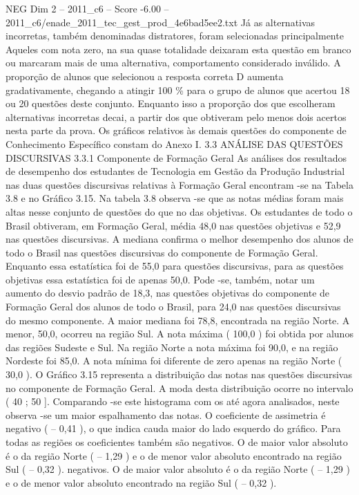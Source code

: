 \begin{textsample}{NEG Dim 2 – 2011\_c6 – Score -6.00 – 2011\_c6/enade\_2011\_tec\_gest\_prod\_4e6bad5ee2.txt}
Já as alternativas incorretas, também denominadas distratores, foram selecionadas principalmente Aqueles com nota zero, na sua quase totalidade deixaram esta questão em branco ou marcaram mais de uma alternativa, comportamento considerado inválido.
A proporção de alunos que selecionou a resposta correta D aumenta gradativamente, chegando a atingir 100 \% para o grupo de alunos que acertou 18 ou 20 questões deste conjunto.
Enquanto isso a proporção dos que escolheram alternativas incorretas decai, a partir dos que obtiveram pelo menos dois acertos nesta parte da prova.
Os gráficos relativos às demais questões do componente de Conhecimento Específico constam do Anexo I. 3.3 ANÁLISE DAS QUESTÕES DISCURSIVAS 3.3.1 Componente de Formação Geral As análises dos resultados de desempenho dos estudantes de Tecnologia em Gestão da Produção Industrial nas duas questões discursivas relativas à Formação Geral encontram -se na Tabela 3.8 e no Gráfico 3.15.
Na tabela 3.8 observa -se que as notas médias foram mais altas nesse conjunto de questões do que no das objetivas.
Os estudantes de todo o Brasil obtiveram, em Formação Geral, média 48,0 nas questões objetivas e 52,9 nas questões discursivas.
A mediana confirma o melhor desempenho dos alunos de todo o Brasil nas questões discursivas do componente de Formação Geral.
Enquanto essa estatística foi de 55,0 para questões discursivas, para as questões objetivas essa estatística foi de apenas 50,0.
Pode -se, também, notar um aumento do desvio padrão de 18,3, nas questões objetivas do componente de Formação Geral dos alunos de todo o Brasil, para 24,0 nas questões discursivas do mesmo componente.
A maior mediana foi 78,8, encontrada na região Norte.
A menor, 50,0, ocorreu na região Sul.
A nota máxima ( 100,0 ) foi obtida por alunos das regiões Sudeste e Sul.
Na região Norte a nota máxima foi 90,0, e na região Nordeste foi 85,0.
A nota mínima foi diferente de zero apenas na região Norte ( 30,0 ).
O Gráfico 3.15 representa a distribuição das notas nas questões discursivas no componente de Formação Geral.
A moda desta distribuição ocorre no intervalo ( 40 ; 50 ].
Comparando -se este histograma com os até agora analisados, neste observa -se um maior espalhamento das notas.
O coeficiente de assimetria é negativo ( – 0,41 ), o que indica cauda maior do lado esquerdo do gráfico.
Para todas as regiões os coeficientes também são negativos.
O de maior valor absoluto é o da região Norte ( – 1,29 ) e o de menor valor absoluto encontrado na região Sul ( – 0,32 ). negativos.
O de maior valor absoluto é o da região Norte ( – 1,29 ) e o de menor valor absoluto encontrado na região Sul ( – 0,32 ).

\end{textsample}
